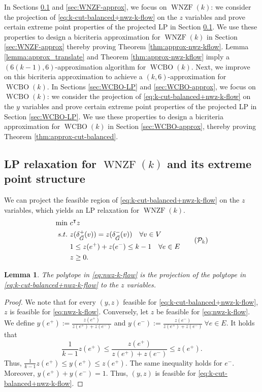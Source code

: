 \documentclass[11pt]{article}
\newtheorem{lemma}[theorem]{Lemma}
\begin{document}
In Sections \ref{sec:WNZF-LP} and \ref{sec:WNZF-approx}, we focus on $\operatorname{WNZF}(k)$: we consider the projection of \eqref{eq:k-cut-balanced+nwz-k-flow} on the $z$ variables and prove certain extreme point properties of the projected LP in Section \ref{sec:WNZF-LP}. We use these properties to design a bicriteria approximation for $\operatorname{WNZF}(k)$ in Section \ref{sec:WNZF-approx} thereby proving Theorem \ref{thm:approx-nwz-kflow}.
Lemma \ref{lemma:approx_translate} and Theorem \ref{thm:approx-nwz-kflow} imply a $(6(k-1),6)$-approximation algorithm for $\operatorname{WCBO}(k)$. Next, we improve on this bicriteria approximation to achieve a $(k, 6)$-approximation for $\operatorname{WCBO}(k)$.  
In Sections \ref{sec:WCBO-LP} and \ref{sec:WCBO-approx}, we focus on $\operatorname{WCBO}(k)$: we consider the projection of \eqref{eq:k-cut-balanced+nwz-k-flow} on the $y$ variables and prove certain extreme point properties of the projected LP in Section \ref{sec:WCBO-LP}. We use these properties to design a bicriteria approximation for $\operatorname{WCBO}(k)$ in Section \ref{sec:WCBO-approx}, thereby proving Theorem \ref{thm:approx-cut-balanced}.

\subsection{LP relaxation for $\operatorname{WNZF}(k)$ and its extreme point structure}\label{sec:WNZF-LP}
We can project the feasible region of \eqref{eq:k-cut-balanced+nwz-k-flow} on the $z$ variables, which yields an LP relaxation for $\operatorname{WNZF}(k)$.
\begin{equation}\label{eq:nwz-k-flow}
    \begin{aligned}
    \min~&c^\intercal z\\
    s.t.~&z(\delta_{\vec{G}}^+(v))=z(\delta_{\vec{G}}^-(v))\quad \forall v\in V\\
    &1\leq z(e^+)+z(e^-)\leq k-1\quad \forall e\in E\\
        &z\geq 0.
    \end{aligned}\tag{$\mathcal{P}_k$}
\end{equation}

\begin{lemma}\label{lemma:proj-z}
    The polytope in \eqref{eq:nwz-k-flow} is the projection of the polytope in \eqref{eq:k-cut-balanced+nwz-k-flow} to the $z$ variables.
\end{lemma}
\begin{proof}
    We note that for every $(y,z)$ feasible for \eqref{eq:k-cut-balanced+nwz-k-flow}, $z$ is feasible for \eqref{eq:nwz-k-flow}. Conversely, let $z$ be feasible for \eqref{eq:nwz-k-flow}. We define $y(e^+):=\frac{z(e^+)}{z(e^+)+z(e^-)}$ and $y(e^-):=\frac{z(e^-)}{z(e^+)+z(e^-)}\ \forall e\in E$. It holds that
    \[
    \frac{1}{k-1}z(e^+)\leq \frac{z(e^+)}{z(e^+)+z(e^-)}\leq z(e^+).
    \]
    Thus, $\frac{1}{k-1}z(e^+)\leq y(e^+)\leq z(e^+)$. The same inequality holds for $e^-$. Moreover, $y(e^+)+y(e^-)=1$. Thus, $(y,z)$ is feasible for \eqref{eq:k-cut-balanced+nwz-k-flow}.
\end{proof}
\end{document}
